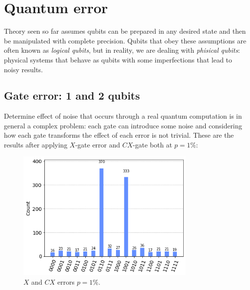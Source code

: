 \documentclass{article}
\begin{document}
\section{Quantum error}
Theory seen so far assumes qubits can be prepared in any desired state and then
be manipulated with complete precision.
Qubits that obey these assumptions are often known as \emph{logical qubits},
but in reality, we are dealing with \emph{phisical qubits}: physical systems
that behave as qubits with some imperfections that lead to noisy results.

\subsection{Gate error: 1 and 2 qubits}
Determine effect of noise that occurs through a real quantum
computation is in general a complex problem:
each gate can introduce some noise and considering how each gate
transforms the effect of each error is not trivial.
These are the results after applying
$X$-gate error and $CX$-gate both at $p = 1\%$:
\begin{figure}[H]
  \centering
  \includegraphics[width=250pt]{Img/error-g.png}
  \caption{$X$ and $CX$ errors $p = 1\%$.}
\end{figure}
\end{document}
